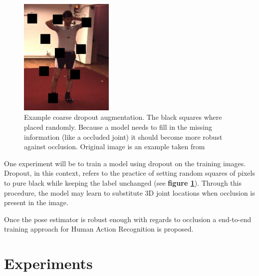 \documentclass[twoside]{article}
\begin{document}
\begin{multicols}{2}
\begin{figure}[H]
    \centering
    \includegraphics[width=0.4\textwidth]{images/dropout.png}
    \caption{Example coarse dropout augmentation. The black squares where placed randomly. Because a model needs to fill in the missing information (like a occluded joint) it should become more robust against occlusion. Original image is an example taken from \cite{ionescu_human3.6m:_2014}}
    \label{fig:dropout}
\end{figure}

One experiment will be to train a model using dropout on the training images.
Dropout, in this context, refers to the practice of setting random squares of pixels to pure black while keeping the label unchanged (see \textbf{figure \ref{fig:dropout}}).
Through this procedure, the model may learn to substitute 3D joint locations when occlusion is present in the image.

Once the pose estimator is robust enough with regards to occlusion a end-to-end training approach for Human Action Recognition is proposed.



\section{Experiments}
\label{sec:experiment}

\end{multicols}
\end{document}
